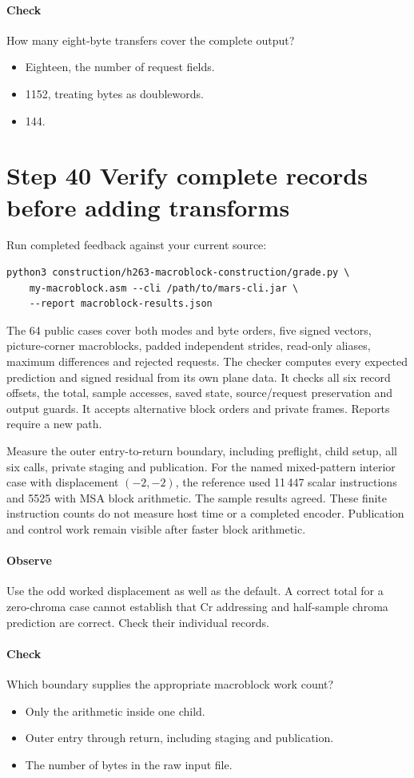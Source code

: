 \paragraph{Check} How many eight-byte transfers cover the complete output?
\begin{itemize}
  \item[A.] Eighteen, the number of request fields.
  \item[B.] 1152, treating bytes as doublewords.
  \item[C.] 144.
\end{itemize}

\section{Step 40 Verify complete records before adding transforms}\label{h263-macroblock-s10}
Run completed feedback against your current source:
\begin{verbatim}
python3 construction/h263-macroblock-construction/grade.py \
    my-macroblock.asm --cli /path/to/mars-cli.jar \
    --report macroblock-results.json
\end{verbatim}
The 64 public cases cover both modes and byte orders, five signed vectors,
picture-corner macroblocks, padded independent strides, read-only aliases, maximum
differences and rejected requests. The checker computes every expected prediction
and signed residual from its own plane data. It checks all six record offsets,
the total, sample accesses, saved state, source/request preservation and output
guards. It accepts alternative block orders and private frames. Reports require
a new path.

Measure the outer entry-to-return boundary, including preflight, child setup,
all six calls, private staging and publication. For the named mixed-pattern
interior case with displacement $(-2,-2)$, the reference used 11\,447 scalar
instructions and 5525 with MSA block arithmetic. The sample results agreed.
These finite instruction counts do not measure host time or a completed encoder.
Publication and control work remain visible after faster block arithmetic.

\paragraph{Observe} Use the odd worked displacement as well as the default.
A correct total for a zero-chroma case cannot establish that Cr addressing and
half-sample chroma prediction are correct. Check their individual records.
\Needspace{8\baselineskip}
\paragraph{Check} Which boundary supplies the appropriate macroblock work count?
\begin{itemize}
  \item[A.] Only the arithmetic inside one child.
  \item[B.] Outer entry through return, including staging and publication.
  \item[C.] The number of bytes in the raw input file.
\end{itemize}
